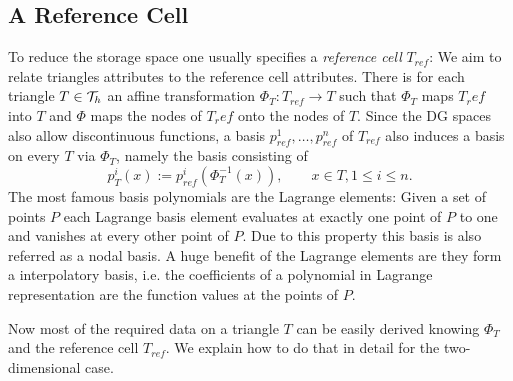 \subsection{A Reference Cell} \label{subsec: ref cell}
To reduce the storage space one usually specifies a \emph{reference cell} $T_{ref}$: We aim to relate triangles attributes to the reference cell attributes. There is for each triangle $T \in \mathcal{T}_h$ an affine transformation $\Phi_T:T_{ref} \rightarrow T$ such that $\Phi_T$ maps $T_ref$ into $T$ and $\Phi$ maps the nodes of $T_ref$ onto the nodes of $T$.
Since the DG spaces also allow discontinuous functions, a basis $p^1_{ref},\dots,p^n_{ref}$ of $T_{ref}$ also induces a basis on every $T$ via $\Phi_T$, namely the basis consisting of 
\[
	p_T^i(x) := p^i_{ref}(\Phi_T^{-1}(x)), \qquad x \in T, 1 \leq i \leq n.
\]
The most famous basis polynomials are the Lagrange elements: Given a set of points $P$ each Lagrange basis element evaluates at exactly one point of $P$ to one and vanishes at every other point of $P$. Due to this property this basis is also referred as a nodal basis. 
A huge benefit of the Lagrange elements are they form a interpolatory basis, i.e. the coefficients of a polynomial in Lagrange representation are the function values at the points of $P$.

Now most of the required data on a triangle $T$ can be easily derived knowing $\Phi_T$ and the reference cell $T_{ref}$. We explain how to do that in detail for the two-dimensional case.

